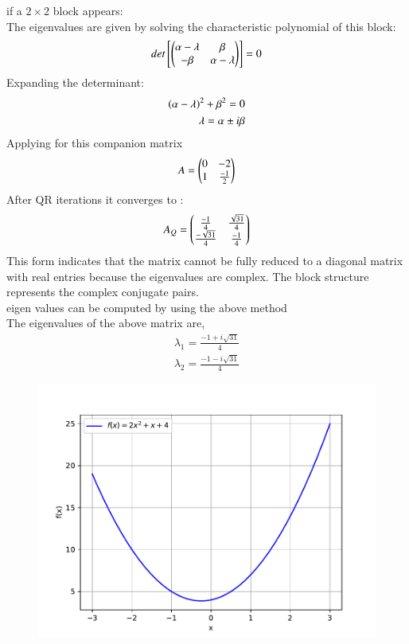 \documentclass[journal]{IEEEtran}
\begin{document}
if a $2\times2$ block appears:\\
The eigenvalues are given by solving the characteristic polynomial of this block:
\begin{align}
    det{}\left[\begin{pmatrix}\alpha - \lambda & \beta\\ -\beta & \alpha - \lambda\end{pmatrix}\right] = 0
\end{align}
Expanding the determinant:\\
\begin{align}
    \left(\alpha-\lambda\right)^2 + \beta^2 = 0\\
    \lambda = \alpha \pm i\beta
\end{align}
Applying for this companion matrix 
\begin{align}
   A = \begin{pmatrix}0 & -2\\1 & \frac{-1}{2}\end{pmatrix} 
\end{align}
After QR iterations it converges to :
\begin{align}
    A_Q = \begin{pmatrix}\frac{-1}{4} & \frac{\sqrt{31}}{4}\\\frac{-\sqrt{31}}{4} & \frac{-1}{4}\end{pmatrix}
\end{align}
This form indicates that the matrix cannot be fully reduced to a diagonal matrix with real entries because the eigenvalues are complex. The block structure represents the complex conjugate pairs.\\
eigen values can be computed by using the above method\\
The eigenvalues of the above matrix are,
\begin{align}
 \lambda_1 = \frac{-1+i\sqrt{31}}{4}\\
 \lambda_2 = \frac{-1-i\sqrt{31}}{4}
\end{align}
\begin{figure}[h!]
   \centering
   \includegraphics[width=\columnwidth]{figs/fig.pdf}
\end{figure}
\end{document}
